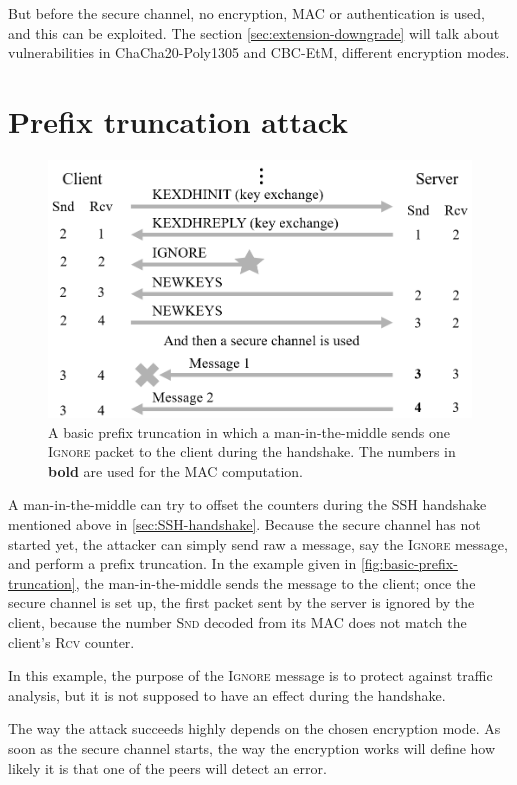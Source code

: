 \documentclass[journal=tches,final]{iacrtrans}
\begin{document}
But before the secure channel, no encryption, MAC or authentication is used, and this can be exploited. The section \autoref{sec:extension-downgrade} will talk about vulnerabilities in ChaCha20-Poly1305 and CBC-EtM, different encryption modes.

\section{Prefix truncation attack}
\label{sec:prefix-truncation}

\begin{figure}
    \centering
    \includegraphics[width=0.6\linewidth]{diagrams-i-made/Basic-prefix-truncation.png}
    \caption{A basic prefix truncation in which a man-in-the-middle sends one \textsc{Ignore} packet to the client during the handshake. The numbers in \textbf{bold} are used for the MAC computation.}
    \label{fig:basic-prefix-truncation}
\end{figure}

A man-in-the-middle can try to offset the counters during the SSH handshake mentioned above in \autoref{sec:SSH-handshake}. Because the secure channel has not started yet, the attacker can simply send raw a message, say the \textsc{Ignore} message, and perform a prefix truncation. In the example given in \autoref{fig:basic-prefix-truncation}, the man-in-the-middle sends the message to the client; once the secure channel is set up, the first packet sent by the server is ignored by the client, because the number \textsc{Snd} decoded from its MAC does not match the client's \textsc{Rcv} counter.

In this example, the purpose of the \textsc{Ignore} message is to protect against traffic analysis, but it is not supposed to have an effect during the handshake.

The way the attack succeeds highly depends on the chosen encryption mode. As soon as the secure channel starts, the way the encryption works will define how likely it is that one of the peers will detect an error. 
\end{document}
